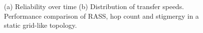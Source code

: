 \begin{figure}[htbp]
    \centering
    \caption{(a) Reliability over time (b) Distribution of transfer speeds. Performance comparison of RASS, hop count and stigmergy in a static grid-like topology.}
    \label{results:staticTopology}
    \vspace{-2mm}
\end{figure}

